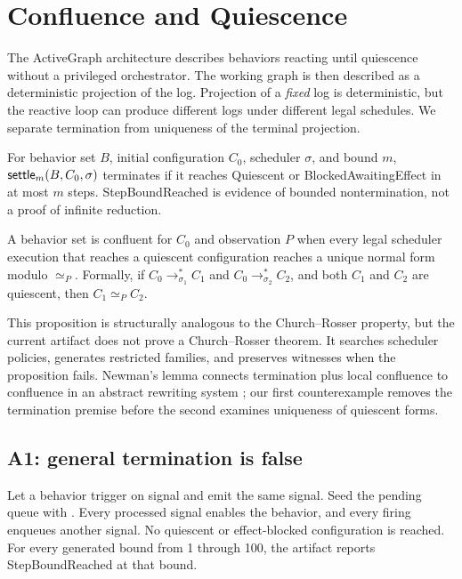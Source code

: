 \section{Confluence and Quiescence}
\label{sec:confluence}

The ActiveGraph architecture describes behaviors reacting until quiescence
without a privileged orchestrator.  The working graph is then described as a
deterministic projection of the log.  Projection of a \emph{fixed} log is
deterministic, but the reactive loop can produce different logs under different
legal schedules.  We separate termination from uniqueness of the terminal
projection.

\begin{definition}
For behavior set $B$, initial configuration $C_0$, scheduler $\sigma$, and
bound $m$, $\mathsf{settle}_m(B,C_0,\sigma)$ terminates if it reaches Quiescent or
BlockedAwaitingEffect in at most $m$ steps.  StepBoundReached is evidence of
bounded nontermination, not a proof of infinite reduction.
\end{definition}

\begin{definition}
A behavior set is confluent for $C_0$ and observation $P$ when every legal
scheduler execution that reaches a quiescent configuration reaches a unique
normal form modulo $\simeq_P$.  Formally, if
$C_0\rightarrow^*_{\sigma_1} C_1$ and
$C_0\rightarrow^*_{\sigma_2} C_2$, and both $C_1$ and $C_2$ are quiescent,
then $C_1\simeq_P C_2$.
\end{definition}

This proposition is structurally analogous to the Church--Rosser property, but
the current artifact does not prove a Church--Rosser theorem.  It searches scheduler policies, generates restricted
families, and preserves witnesses when the proposition fails.  Newman's lemma
connects termination plus local confluence to confluence in an abstract
rewriting system \cite{newman1942}; our first counterexample removes the
termination premise before the second examines uniqueness of quiescent forms.

\subsection{A1: general termination is false}

\begin{counterexample}
Let a behavior trigger on signal  and emit the same signal.  Seed the
pending queue with .  Every processed signal enables the behavior,
and every firing enqueues another signal.  No quiescent or effect-blocked
configuration is reached.  For every generated bound from 1 through 100, the
artifact reports StepBoundReached at that bound.
\end{counterexample}

